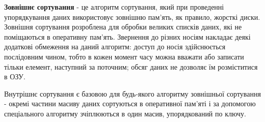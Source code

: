 \textbf{Зовнішнє сортування} - це алгоритм сортування, який при проведенні упорядкування даних використовує зовнішню пам'ять, як правило, жорсткі диски. Зовнішня сортування розроблена для обробки великих списків даних, які не поміщаються в оперативну пам'ять. Звернення до різних носіям накладає деякі додаткові обмеження на даний алгоритм: доступ до носія здійснюється послідовним чином, тобто в кожен момент часу можна вважати або записати тільки елемент, наступний за поточним; обсяг даних не дозволяє їм розміститися в ОЗУ.

Внутрішнє сортування є базовою для будь-якого алгоритму зовнішньої сортування - окремі частини масиву даних сортуються в оперативної пам'яті і за допомогою спеціального алгоритму зчіплюються в один масив, упорядкований по ключу.






